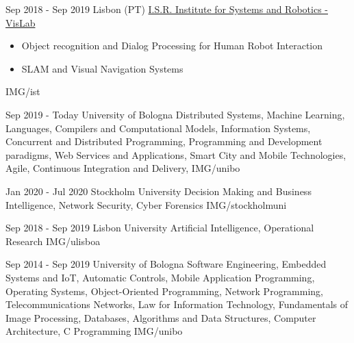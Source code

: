 \documentclass[paper=a4,fontsize=11pt, hidelinks]{temp} %
\def\isShort{1} %
\begin{document}
{Sep 2018 - Sep 2019 }
{Lisbon (PT) \href{https://welcome.isr.tecnico.ulisboa.pt/}{ I.S.R. Institute for Systems and Robotics - VisLab}}
{
 \begin{itemize}
    \item Object recognition and Dialog Processing for Human Robot Interaction
    \item SLAM and Visual Navigation Systems
 \end{itemize}
} {IMG/ist}

\noindent

{Sep 2019 - Today}
{University of Bologna}
{
    \ifthenelse{\isShort=0} {%
    Distributed Systems, Machine Learning,    Languages, Compilers and Computational Models,    Information Systems,     Concurrent and Distributed Programming,    Programming and Development paradigms,    Web Services and Applications,     Smart City and Mobile Technologies,     Agile, Continuous Integration and Delivery, 
    }{ %
    } 
} 
{IMG/unibo}


\sepspace

{Jan 2020 - Jul 2020}
{Stockholm University}
{Decision Making and Business Intelligence, Network Security, Cyber Forensics}
{IMG/stockholmuni}

\sepspace

{Sep 2018 - Sep 2019}
{Lisbon University}
{Artificial Intelligence, Operational Research} 
{IMG/ulisboa}

\sepspace

{Sep 2014 - Sep 2019}
{University of Bologna }
{
    \ifthenelse{\isShort=0} {%
    Software Engineering, Embedded Systems and IoT, Automatic Controls, Mobile Application Programming, Operating Systems, Object-Oriented Programming, Network Programming, Telecommunications Networks, Law for Information Technology, Fundamentals of Image Processing, Databases, Algorithms and Data Structures, Computer Architecture, C Programming
    }{ %
    } 
} 
{IMG/unibo}
\end{document}
